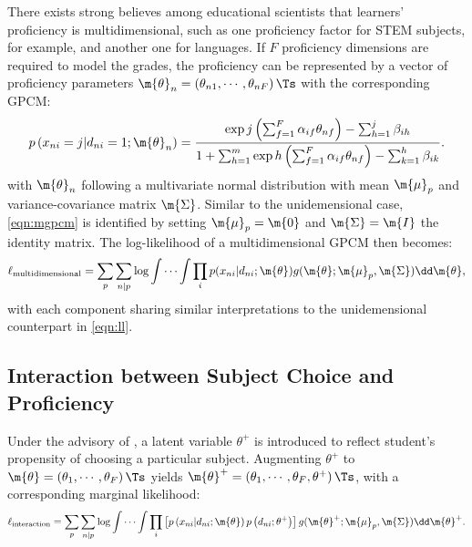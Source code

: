 There exists strong believes among educational scientists that learners' proficiency is multidimensional, such as one proficiency factor for STEM subjects, for example, and another one for languages. If $F$ proficiency dimensions are required to model the grades, the proficiency can be represented by a vector of proficiency parameters $\m{\theta}_n=\left(\theta_{n1}, \cdots, \theta_{nF}\right)\Ts$ with the corresponding GPCM:
\begin{equation}\label{eqn:mgpcm}
    p \left( x_{ni} = j | d_{ni} = 1; \m{\theta}_n \right) =
    \frac{ \exp{ j \left( \sum_{f=1}^F \alpha_{if} \theta_{nf} \right) - \sum_{h=1}^j \beta_{ih} } }{ 1 + \sum_{h=1}^m \exp{ h \left( \sum_{f=1}^F \alpha_{if} \theta_{nf} \right) - \sum_{k=1}^h \beta_{ik} } }.
\end{equation}
with $\m{\theta}_n$ following a multivariate normal distribution with mean $\m{\mu}_p$ and variance-covariance matrix $\m{\Sigma}$. Similar to the unidemensional case, \cref{eqn:mgpcm} is identified by setting $\m{\mu}_p=\m{0}$ and $\m{\Sigma} = \m{I}$ the identity matrix. The log-likelihood of a multidimensional GPCM then becomes:
\begin{equation}\label{eqn:mll}
    \ell_\text{multidimensional} = \sum_{p} \sum_{n | p} \log \int \cdots \int \prod_i p( x_{ni} | d_{ni}; \m{\theta} ) g( \m{\theta}; \m{\mu}_p, \m{\Sigma} ) \dd \m{\theta},
\end{equation}
with each component sharing similar interpretations to the unidemensional counterpart in \cref{eqn:ll}.

\subsection{Interaction between Subject Choice and Proficiency}

Under the advisory of \textcite{korobko:2008}, a latent variable $\theta^+$ is introduced to reflect student's propensity of choosing a particular subject. Augmenting $\theta^+$ to $\m{\theta}=\left(\theta_1, \cdots, \theta_F\right)\Ts$ yields $\m{\theta}^+=\left(\theta_1, \cdots, \theta_F, \theta^+\right)\Ts$, with a corresponding marginal likelihood:
\begin{equation}\label{eqn:lli}
    \ell_\text{interaction} = \sum_p \sum_{ n | p} \log \int \cdots \int \prod_i \left[ p \left( x_{ni} | d_{ni}; \m{\theta} \right) p \left( d_{ni}; \theta^+ \right) \right] g(\m{\theta}^+; \m{\mu}_p, \m{\Sigma}) \dd \m{\theta}^+ .
\end{equation}